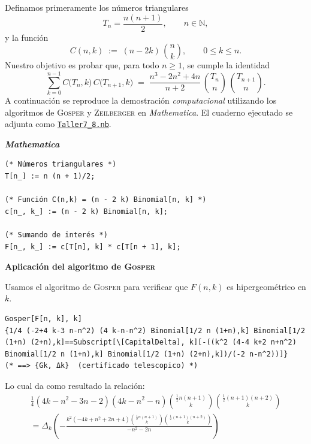 \begin{solucion}
Definamos primeramente los números triangulares
\[
  T_n=\frac{n(n+1)}{2},\qquad n\in\mathbb{N},
\]
y la función
\[
  C(n,k)\;:=\;(n-2k)\,\binom{n}{k},\qquad 0\le k\le n.
\]
Nuestro objetivo es probar que, para todo $n\ge 1$, se cumple la identidad
\begin{equation}\label{eq:id}
  \sum_{k=0}^{n-1}
        C\bigl(T_n,k\bigr)\,C\bigl(T_{n+1},k\bigr)
  \;=\;
  \frac{n^{3}-2n^{2}+4n}{n+2}\,
  \binom{T_n}{n}\,\binom{T_{n+1}}{n}.
\end{equation}
A continuación se reproduce la demostración \emph{computacional} utilizando los algoritmos de
\textsc{Gosper} y \textsc{Zeilberger} en \textit{Mathematica}. El cuaderno ejecutado se adjunta como
\href{run:Taller7_8.nb}{\texttt{Taller7\_8.nb}}.

\textbf{\textit{Mathematica}}

\begin{lstlisting}[caption={Definición de los objetos básicos}]
(* Números triangulares *)
T[n_] := n (n + 1)/2;

(* Función C(n,k) = (n - 2 k) Binomial[n, k] *)
c[n_, k_] := (n - 2 k) Binomial[n, k];

(* Sumando de interés *)
F[n_, k_] := c[T[n], k] * c[T[n + 1], k];
\end{lstlisting}

\textbf{Aplicación del algoritmo de \textsc{Gosper}}

Usamos el algoritmo de \textsc{Gosper} para verificar que $F(n,k)$ es hipergeométrico en $k$.

\begin{lstlisting}[caption={Algoritmo de Gosper}]
Gosper[F[n, k], k]
{1/4 (-2+4 k-3 n-n^2) (4 k-n-n^2) Binomial[1/2 n (1+n),k] Binomial[1/2 (1+n) (2+n),k]==Subscript[\[CapitalDelta], k][-((k^2 (4-4 k+2 n+n^2) Binomial[1/2 n (1+n),k] Binomial[1/2 (1+n) (2+n),k])/(-2 n-n^2))]}
(* ==> {Gk, Δk}  (certificado telescopico) *)
\end{lstlisting}

Lo cual da como resultado la relación:
\begin{align*}
    \frac{1}{4} \left(4 k-n^2-3 n-2\right) \left(4 k-n^2-n\right) \binom{\frac{1}{2} n (n+1)}{k} \binom{\frac{1}{2} (n+1) (n+2)}{k} \\=\Delta _k\left(-\frac{k^2 \left(-4 k+n^2+2 n+4\right) \binom{\frac{1}{2} n (n+1)}{k} \binom{\frac{1}{2} (n+1) (n+2)}{k}}{-n^2-2 n}\right)
\end{align*}


\end{solucion}
